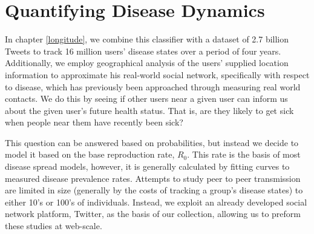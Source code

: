 \section{Quantifying Disease Dynamics}
In chapter \ref{longitude}, we combine this classifier with a dataset of 2.7 billion Tweets to track 16 million users' disease states over a period of four years. Additionally, we employ geographical analysis of the users' supplied location information to approximate his real-world social network, \cite{hawelka2014geo,leetaru2013mapping,tatem2014mapping} specifically with respect to disease, which has previously been approached through measuring real world contacts. \cite{isella2011close,salathe2010high,smieszek2014should} We do this by seeing if other users near a given user can inform us about the given user's future health status. That is, are they likely to get sick when people near them have recently been sick?

This question can be answered based on probabilities, but instead we decide to model it based on the base reproduction rate, \(R_0\). This rate is the basis of most disease spread models, however, it is generally calculated by fitting curves to measured disease prevalence rates.\cite{yang2015inference} Attempts to study peer to peer transmission are limited in size (generally by the costs of tracking a group's disease states) to either 10's or 100's of individuals\cite{Cauchemez:2011cp,moser1979outbreak,klontz1989outbreak,salathe2010high}. Instead, we exploit an already developed social network platform, Twitter, as the basis of our collection, allowing us to preform these studies at web-scale.


